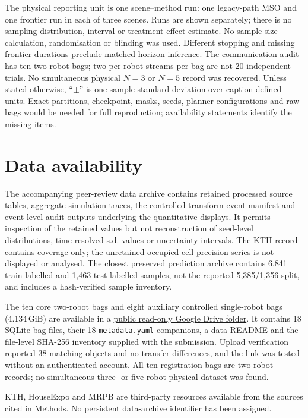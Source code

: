 \documentclass[11pt]{article}
\begin{document}
The physical reporting unit is one scene--method run: one legacy-path MSO and one frontier run in each of three scenes. Runs are shown separately; there is no sampling distribution, interval or treatment-effect estimate. No sample-size calculation, randomisation or blinding was used. Different stopping and missing frontier durations preclude matched-horizon inference. The communication audit has ten two-robot bags; two per-robot streams per bag are not 20 independent trials. No simultaneous physical $N{=}3$ or $N{=}5$ record was recovered. Unless stated otherwise, ``$\pm$'' is one sample standard deviation over caption-defined units. Exact partitions, checkpoint, masks, seeds, planner configurations and raw bags would be needed for full reproduction; availability statements identify the missing items.

\section{Data availability}

The accompanying peer-review data archive contains retained processed source tables, aggregate simulation traces, the controlled transform-event manifest and event-level audit outputs underlying the quantitative displays. It permits inspection of the retained values but not reconstruction of seed-level distributions, time-resolved s.d. values or uncertainty intervals. The KTH record contains coverage only; the unretained occupied-cell-precision series is not displayed or analysed. The closest preserved prediction archive contains 6{,}841 train-labelled and 1{,}463 test-labelled samples, not the reported 5{,}385/1{,}356 split, and includes a hash-verified sample inventory.

The ten core two-robot bags and eight auxiliary controlled single-robot bags (4.134\,GiB) are available in a \href{https://drive.google.com/drive/folders/1mbCuIISidEy87mmWPbZTtiRKfW54Fhii?usp=sharing}{public read-only Google Drive folder}. It contains 18 SQLite bag files, their 18 \texttt{metadata.yaml} companions, a data README and the file-level SHA-256 inventory supplied with the submission. Upload verification reported 38 matching objects and no transfer differences, and the link was tested without an authenticated account. All ten registration bags are two-robot records; no simultaneous three- or five-robot physical dataset was found.

KTH, HouseExpo and MRPB are third-party resources available from the sources cited in Methods. No persistent data-archive identifier has been assigned.
\end{document}
